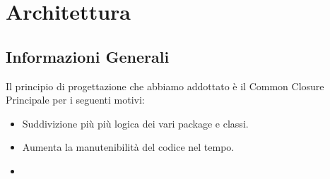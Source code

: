 \newpage
\section{Architettura}
\subsection{Informazioni Generali}
Il principio di progettazione che abbiamo addottato è il Common Closure Principale per i seguenti motivi:
\begin{itemize}
\item Suddivizione più più logica dei vari package e classi.
\item Aumenta la manutenibilità del codice nel tempo.
\item
\end{itemize}




\newpage